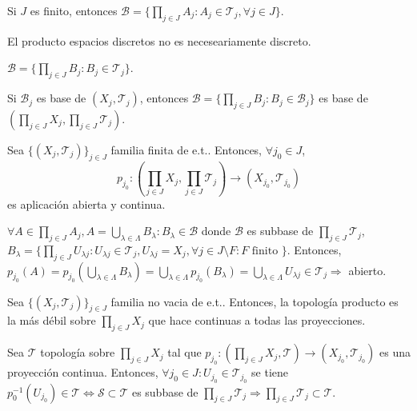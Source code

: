 \begin{obs}
  Si $J$ es finito, entonces $ \mathcal{B} = \big\{ \prod_{j \in J} A_{j}: A_{j} \in \mathcal{T}_{j}, \forall j \in J \big\}$.
\end{obs}

\begin{obs}
  El producto espacios discretos no es neceseariamente discreto.
\end{obs}

\begin{obs}
  $\mathcal{B} = \{  \prod_{j \in J} B_{j} : B_{j} \in \mathcal{T}_{j}\}$.
\end{obs}

\begin{obs}
  Si $\mathcal{B}_{j}$ es base de $( X_{j}, \mathcal{T}_{j} )$, entonces $\mathcal{B} = \{ \prod_{j \in J} B_{j} : B_{j} \in \mathcal{B}_{j} \}$ es base de $( \prod_{j \in J} X_{j}, \prod_{j \in J} \mathcal{T}_{j} )$.
\end{obs}

\begin{prop}
  Sea $\{( X_{j}, \mathcal{T}_{j} )\}_{j \in J}$ familia finita de e.t.. Entonces, $\forall j_{0} \in J$, 
  \[ 
    p_{j_{0}}: ( \prod_{j \in J} X_{j}, \prod_{j \in J} \mathcal{T}_{j} ) \to ( X_{j_{0}}, \mathcal{T}_{j_{0}} )
  \] 
  es aplicación abierta y continua.
\end{prop}

\begin{dem}
  $\forall A \in \prod_{j \in J} A_{j}, A = \bigcup_{\lambda \in \Lambda} B_{\lambda} : B_{\lambda} \in \mathcal{B}$ donde $\mathcal{B}$ es subbase de $\prod_{j \in J} \mathcal{T}_{j}$, $B_{\lambda} = \{ \prod_{j \in J} U_{\lambda j}: U_{\lambda j} \in \mathcal{T}_{j}, U_{\lambda j} = X_{j}, \forall j \in J \setminus F: F \text{ finito }\}$. Entonces, $p_{j_{0}}(A) = p_{j_{0}}(\bigcup_{\lambda \in \Lambda} B_{\lambda}) = \bigcup_{\lambda \in \Lambda} p_{j_{0}}(B_{\lambda}) = \bigcup_{\lambda \in \Lambda} U_{\lambda j} \in \mathcal{T}_{j} \Rightarrow $ abierto.
\end{dem}

\begin{prop}
  Sea $\{ ( X_{j}, \mathcal{T}_{j} ) \}_{j \in J}$ familia no vacia de e.t.. Entonces, la topología producto es la más débil sobre $\prod_{j \in J} X_{j}$ que hace continuas a todas las proyecciones.
\end{prop}

\begin{dem}
  Sea $\mathcal{T}$ topología sobre $ \prod_{j \in J} X_{j}$ tal que $p_{j_{0}}: ( \prod_{j \in J} X_{j}, \mathcal{T} ) \to ( X_{j_{0}}, \mathcal{T}_{j_{0}} )$ es una proyección continua. Entonces, $\forall j_{0} \in J: U_{j_{0}} \in \mathcal{T}_{j_{0}}$ se tiene $p_{0}^{-1}(U_{j_{0}}) \in \mathcal{T} \Leftrightarrow \mathcal{S} \subset \mathcal{T}$ es subbase de $\prod_{j \in J} \mathcal{T}_{j} \Rightarrow \prod_{j \in J} \mathcal{T}_{j} \subset \mathcal{T}$.
\end{dem}
